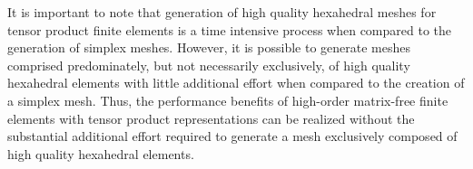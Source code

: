 It is important to note that generation of high quality hexahedral meshes for tensor product finite elements is a time intensive process when compared to the generation of simplex meshes.
However, it is possible to generate meshes comprised predominately, but not necessarily exclusively, of high quality hexahedral elements with little additional effort when compared to the creation of a simplex mesh.
Thus, the performance benefits of high-order matrix-free finite elements with tensor product representations can be realized without the substantial additional effort required to generate a mesh exclusively composed of high quality hexahedral elements.
